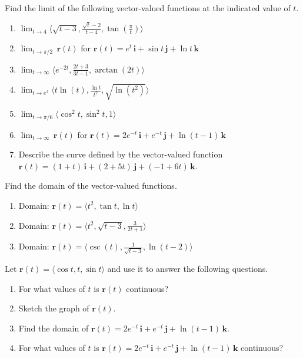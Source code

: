 \documentclass{exercises}
\begin{document}
Find the limit of the following vector-valued functions at the indicated value of $t$.

\begin{enumerate}[resume]
\item $\lim_{t\to4}\langle \sqrt{t-3},\frac{\sqrt{t}-2}{t-4},\tan(\frac{\pi}{t})\rangle$
\item $\lim_{t\to \pi/2}\,\mathbf{r}(t)$ for $\mathbf{r}(t)=e^{t}\,\mathbf{i}+\sin t\,\mathbf{j}+\ln t\,\mathbf{k}$
\item $\lim_{t\to \infty}\langle e^{-2t},\frac{2t+3}{3t-1},\arctan(2t)\rangle$
\item $\lim_{t\to e^{2}}\langle t\ln(t),\frac{\ln t}{t^{2}},\sqrt{\ln (t^{2})}\rangle$
\item $\lim_{t\to \pi/6}\langle \cos^{2}t,\sin^{2}t,1\rangle$
\item $\lim_{t\to \infty}\,\mathbf{r}(t)$ for $\mathbf{r}(t)=2e^{-t}\,\mathbf{i}+e^{-t}\,\mathbf{j}+\ln(t-1)\,\mathbf{k}$
\item Describe the curve defined by the vector-valued function $\mathbf{r}(t)=(1+t)\,\mathbf{i}+(2+5t)\,\mathbf{j}+(-1+6t)\,\mathbf{k}$.
\end{enumerate}

Find the domain of the vector-valued functions.

\begin{enumerate}[resume]
\item Domain: $\mathbf{r}(t)=\langle t^{2},\tan t,\ln t\rangle$
\item Domain: $\mathbf{r}(t)=\langle t^{2},\sqrt{t-3},\frac{3}{2t+1}\rangle$
\item Domain: $\mathbf{r}(t)=\langle \csc(t),\frac{1}{\sqrt{t-3}},\ln(t-2)\rangle$
\end{enumerate}

Let $\mathbf{r}(t)=\langle \cos t,t,\sin t\rangle$ and use it to answer the following questions.

\begin{enumerate}[resume]
\item For what values of $t$ is $\mathbf{r}(t)$ continuous?
\item Sketch the graph of $\mathbf{r}(t)$.
\item Find the domain of $\mathbf{r}(t)=2e^{-t}\,\mathbf{i}+e^{-t}\,\mathbf{j}+\ln(t-1)\,\mathbf{k}$.
\item For what values of $t$ is $\mathbf{r}(t)=2e^{-t}\,\mathbf{i}+e^{-t}\,\mathbf{j}+\ln(t-1)\,\mathbf{k}$ continuous?
\end{enumerate}
\end{document}
